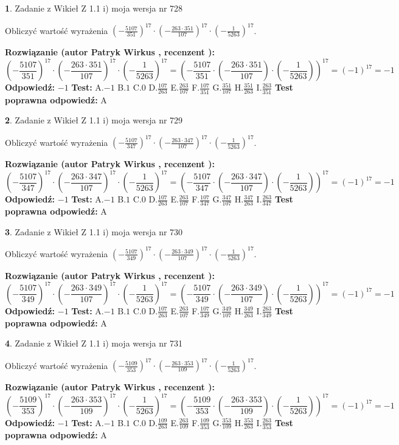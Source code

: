 \documentclass[12pt, a4paper]{article}
\theoremstyle{definition} %
\newtheorem{zad}{}
\newcommand{\zadStart}[1]{\begin{zad}#1\newline}
\newcommand{\zadStop}{\end{zad}}
\newcommand{\rozwStart}[2]{\noindent \textbf{Rozwiązanie (autor #1 , recenzent #2): }\newline}
\newcommand{\rozwStop}{\newline}
\newcommand{\odpStart}{\noindent \textbf{Odpowiedź:}\newline}
\newcommand{\odpStop}{\newline}
\newcommand{\testStart}{\noindent \textbf{Test:}\newline}
\newcommand{\testStop}{\newline}
\newcommand{\kluczStart}{\noindent \textbf{Test poprawna odpowiedź:}\newline}
\newcommand{\kluczStop}{\newline}
\begin{document}
\zadStart{Zadanie z Wikieł Z 1.1 i) moja wersja nr 728}

Obliczyć wartość wyrażenia $(-\frac{5107}{351})^{17} \cdot (-\frac{263 \cdot 351}{107})^{17} \cdot (-\frac{1}{5263})^{17}$.
\zadStop
\rozwStart{Patryk Wirkus}{}
$$(-\frac{5107}{351})^{17} \cdot (-\frac{263 \cdot 351}{107})^{17} \cdot (-\frac{1}{5263})^{17} = (-\frac{5107}{351} \cdot (-\frac{263 \cdot 351}{107}) \cdot (-\frac{1}{5263}))^{17} = (-1)^{17} = -1$$
\rozwStop
\odpStart
$-1$
\odpStop
\testStart
A.$-1$ B.$1$ C.$0$ D.$\frac{107}{263}$ E.$\frac{263}{107}$
F.$\frac{107}{351}$ G.$\frac{351}{107}$
H.$\frac{351}{263}$
I.$\frac{263}{351}$
\testStop
\kluczStart
A
\kluczStop



\zadStart{Zadanie z Wikieł Z 1.1 i) moja wersja nr 729}

Obliczyć wartość wyrażenia $(-\frac{5107}{347})^{17} \cdot (-\frac{263 \cdot 347}{107})^{17} \cdot (-\frac{1}{5263})^{17}$.
\zadStop
\rozwStart{Patryk Wirkus}{}
$$(-\frac{5107}{347})^{17} \cdot (-\frac{263 \cdot 347}{107})^{17} \cdot (-\frac{1}{5263})^{17} = (-\frac{5107}{347} \cdot (-\frac{263 \cdot 347}{107}) \cdot (-\frac{1}{5263}))^{17} = (-1)^{17} = -1$$
\rozwStop
\odpStart
$-1$
\odpStop
\testStart
A.$-1$ B.$1$ C.$0$ D.$\frac{107}{263}$ E.$\frac{263}{107}$
F.$\frac{107}{347}$ G.$\frac{347}{107}$
H.$\frac{347}{263}$
I.$\frac{263}{347}$
\testStop
\kluczStart
A
\kluczStop



\zadStart{Zadanie z Wikieł Z 1.1 i) moja wersja nr 730}

Obliczyć wartość wyrażenia $(-\frac{5107}{349})^{17} \cdot (-\frac{263 \cdot 349}{107})^{17} \cdot (-\frac{1}{5263})^{17}$.
\zadStop
\rozwStart{Patryk Wirkus}{}
$$(-\frac{5107}{349})^{17} \cdot (-\frac{263 \cdot 349}{107})^{17} \cdot (-\frac{1}{5263})^{17} = (-\frac{5107}{349} \cdot (-\frac{263 \cdot 349}{107}) \cdot (-\frac{1}{5263}))^{17} = (-1)^{17} = -1$$
\rozwStop
\odpStart
$-1$
\odpStop
\testStart
A.$-1$ B.$1$ C.$0$ D.$\frac{107}{263}$ E.$\frac{263}{107}$
F.$\frac{107}{349}$ G.$\frac{349}{107}$
H.$\frac{349}{263}$
I.$\frac{263}{349}$
\testStop
\kluczStart
A
\kluczStop



\zadStart{Zadanie z Wikieł Z 1.1 i) moja wersja nr 731}

Obliczyć wartość wyrażenia $(-\frac{5109}{353})^{17} \cdot (-\frac{263 \cdot 353}{109})^{17} \cdot (-\frac{1}{5263})^{17}$.
\zadStop
\rozwStart{Patryk Wirkus}{}
$$(-\frac{5109}{353})^{17} \cdot (-\frac{263 \cdot 353}{109})^{17} \cdot (-\frac{1}{5263})^{17} = (-\frac{5109}{353} \cdot (-\frac{263 \cdot 353}{109}) \cdot (-\frac{1}{5263}))^{17} = (-1)^{17} = -1$$
\rozwStop
\odpStart
$-1$
\odpStop
\testStart
A.$-1$ B.$1$ C.$0$ D.$\frac{109}{263}$ E.$\frac{263}{109}$
F.$\frac{109}{353}$ G.$\frac{353}{109}$
H.$\frac{353}{263}$
I.$\frac{263}{353}$
\testStop
\kluczStart
A
\kluczStop
\end{document}
